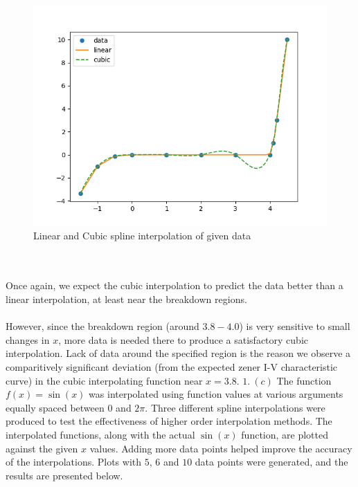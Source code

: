 \documentclass[12pt]{article}
\begin{document}
	\begin{figure}[h]
		\centering
		\includegraphics[scale=0.75]{1b.png}
		\caption{Linear and Cubic spline interpolation of given data}
	\end{figure}\\\\
Once again, we expect the cubic interpolation to predict the data better than a linear interpolation, at least near the breakdown regions. \\\\ However, since the breakdown region (around $3.8 - 4.0$) is very sensitive to small changes in $x$, more data is needed there to produce a satisfactory cubic interpolation.
Lack of data around the specified region is the reason we observe a comparitively significant deviation (from the expected zener I-V characteristic curve) in the cubic interpolating function near $x = 3.8$.
\newpage
\indent $1. \ (c)$ The function $f(x) = \sin(x)$ was interpolated using function values at various arguments equally spaced between $0$ and $2\pi$. Three different spline interpolations were produced to test the effectiveness of higher order interpolation methods. The interpolated functions, along with the actual $\sin(x)$ function, are plotted against the given $x$ values. Adding more data points helped improve the accuracy of the interpolations. Plots with $5$, $6$ and $10$ data points were generated, and the results are presented below.
\end{document}
